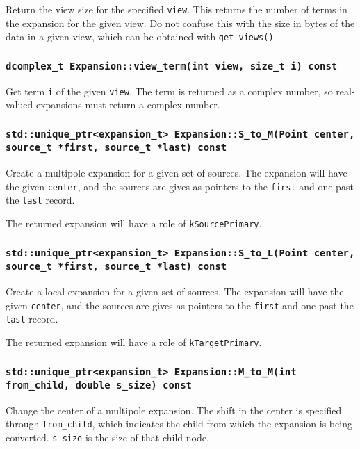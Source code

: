 Return the view size for the specified \texttt{view}. This returns the number
of terms in the expansion for the given view. Do not confuse this with the
size in bytes of the data in a given view, which can be obtained with
\texttt{get\_views()}.

\subsubsection{\texttt{dcomplex\_t Expansion::view\_term(int view, size\_t i) const}}

Get term \texttt{i} of the given \texttt{view}. The term is returned as a
complex number, so real-valued expansions must return a complex number.

\subsubsection{\texttt{std::unique\_ptr<expansion\_t> Expansion::S\_to\_M(Point center, source\_t *first, source\_t *last) const}}

Create a multipole expansion for a given set of sources. The expansion will
have the given \texttt{center}, and the sources are gives as pointers to the
\texttt{first} and one past the \texttt{last} record.

The returned expansion will have a role of \texttt{kSourcePrimary}.

\subsubsection{\texttt{std::unique\_ptr<expansion\_t> Expansion::S\_to\_L(Point center, source\_t *first, source\_t *last) const}}

Create a local expansion for a given set of sources. The expansion will
have the given \texttt{center}, and the sources are gives as pointers to the
\texttt{first} and one past the \texttt{last} record.

The returned expansion will have a role of \texttt{kTargetPrimary}.

\subsubsection{\texttt{std::unique\_ptr<expansion\_t> Expansion::M\_to\_M(int from\_child, double s\_size) const}}

Change the center of a multipole expansion. The shift in the center is
specified through \texttt{from\_child}, which indicates the child from which
the expansion is being converted. \texttt{s\_size} is the size of that child
node.

